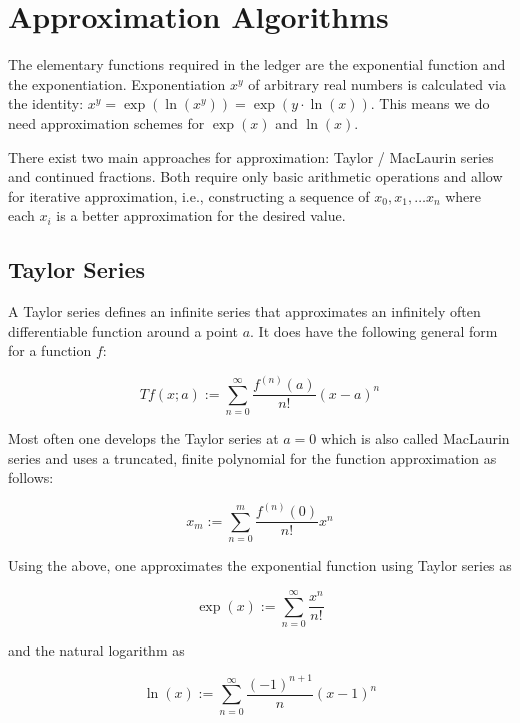 \documentclass[11pt,a4paper,dvipsnames]{article}
\theoremstyle{definition}
\theoremstyle{definition}
\begin{document}
\section{Approximation Algorithms}
\label{sec:algorithms}

The elementary functions required in the ledger are the exponential function and
the exponentiation. Exponentiation $x^{y}$ of arbitrary real numbers is
calculated via the identity: $x^{y}= \exp({\ln(x^{y})}) = \exp(y\cdot
\ln(x))$. This means we do need approximation schemes for $\exp(x)$ and
$\ln(x)$.

There exist two main approaches for approximation: Taylor / MacLaurin series and
continued fractions. Both require only basic arithmetic operations and allow for
iterative approximation, i.e., constructing a sequence of $x_{0},x_{1},\ldots
x_{n}$ where each $x_{i}$ is a better approximation for the desired value.

\subsection{Taylor Series}
\label{sec:taylor-series}

A Taylor series defines an infinite series that approximates an infinitely often
differentiable function around a point $a$. It does have the following general
form for a function $f$:

\begin{equation*}
  Tf(x; a) := \sum_{n=0}^{\infty}\frac{f^{(n)}(a)}{n!}
  {\left(
    x - a
  \right)}^{n}
\end{equation*}

Most often one develops the Taylor series at $a=0$ which is also called
MacLaurin series and uses a truncated, finite polynomial for the function
approximation as follows:

\begin{equation*}
  x_{m} := \sum_{n=0}^{m}\frac{f^{(n)}(0)}{n!} x^{n}
\end{equation*}

Using the above, one approximates the exponential function using Taylor series
as

\begin{equation*}
  \exp(x) := \sum_{n=0}^{\infty}\frac{x^{n}}{n!}
\end{equation*}

and the natural logarithm as

\begin{equation*}
  \ln(x) := \sum_{n=0}^{\infty}\frac{(-1)^{n+1}}{n}
    {\left(
        x - 1
    \right)}^{n}
\end{equation*}
\end{document}
